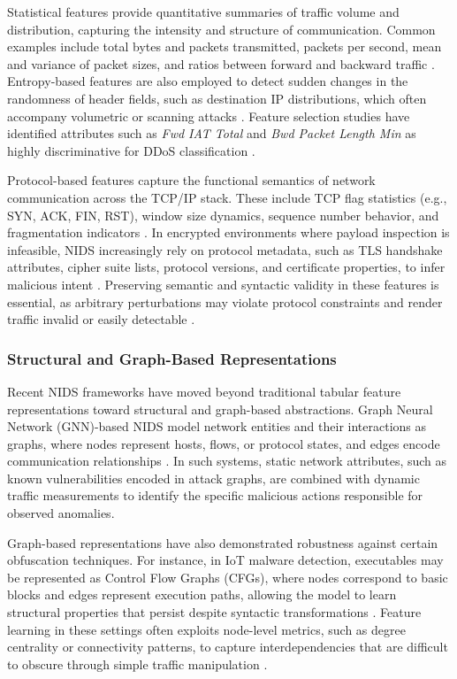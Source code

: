 Statistical features provide quantitative summaries of traffic volume and distribution, capturing the intensity and structure of communication. Common examples include total bytes and packets transmitted, packets per second, mean and variance of packet sizes, and ratios between forward and backward traffic \cite{hashemi2020enhancing}. Entropy-based features are also employed to detect sudden changes in the randomness of header fields, such as destination IP distributions, which often accompany volumetric or scanning attacks \cite{doriguzzi2020lucid}. Feature selection studies have identified attributes such as \textit{Fwd IAT Total} and \textit{Bwd Packet Length Min} as highly discriminative for DDoS classification \cite{mccarthy2021feature}.

Protocol-based features capture the functional semantics of network communication across the TCP/IP stack. These include TCP flag statistics (e.g., SYN, ACK, FIN, RST), window size dynamics, sequence number behavior, and fragmentation indicators \cite{wang2024progen, hartl2020explainability}. In encrypted environments where payload inspection is infeasible, NIDS increasingly rely on protocol metadata, such as TLS handshake attributes, cipher suite lists, protocol versions, and certificate properties, to infer malicious intent \cite{cui2023cbseq}. Preserving semantic and syntactic validity in these features is essential, as arbitrary perturbations may violate protocol constraints and render traffic invalid or easily detectable \cite{vitorino2023sok}.

\subsubsection{Structural and Graph-Based Representations}

Recent NIDS frameworks have moved beyond traditional tabular feature representations toward structural and graph-based abstractions. Graph Neural Network (GNN)-based NIDS model network entities and their interactions as graphs, where nodes represent hosts, flows, or protocol states, and edges encode communication relationships \cite{sun2024gnn, esmaeili2023gnn}. In such systems, static network attributes, such as known vulnerabilities encoded in attack graphs, are combined with dynamic traffic measurements to identify the specific malicious actions responsible for observed anomalies.

Graph-based representations have also demonstrated robustness against certain obfuscation techniques. For instance, in IoT malware detection, executables may be represented as Control Flow Graphs (CFGs), where nodes correspond to basic blocks and edges represent execution paths, allowing the model to learn structural properties that persist despite syntactic transformations \cite{esmaeili2023gnn}. Feature learning in these settings often exploits node-level metrics, such as degree centrality or connectivity patterns, to capture interdependencies that are difficult to obscure through simple traffic manipulation \cite{sun2024gnn}.

